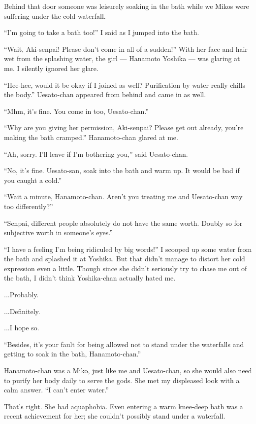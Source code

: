 Behind that door someone was leisurely soaking in the bath while we Mikos were suffering under the cold waterfall.

``I'm going to take a bath too!'' I said as I jumped into the bath.

``Wait, Aki-senpai! Please don't come in all of a sudden!''  With her face and hair wet from the splashing water, the girl --- Hanamoto Yoshika --- was glaring at me. I silently ignored her glare.

``Hee-hee, would it be okay if I joined as well? Purification by water really chills the body.''  Uesato-chan appeared from behind and came in as well.

``Mhm, it's fine. You come in too, Uesato-chan.''

``Why are you giving her permission, Aki-senpai? Please get out already, you're making the bath cramped.'' Hanamoto-chan glared at me.

``Ah, sorry. I'll leave if I'm bothering you,'' said Uesato-chan.

``No, it's fine. Uesato-san, soak into the bath and warm up. It would be bad if you caught a cold.''

``Wait a minute, Hanamoto-chan. Aren't you treating me and Uesato-chan way too differently?''

``Senpai, different people absolutely do not have the same worth. Doubly so for subjective worth in someone's eyes.''

``I have a feeling I'm being ridiculed by big words!''  I scooped up some water from the bath and splashed it at Yoshika. But that didn't manage to distort her cold expression even a little. Though since she didn't seriously try to chase me out of the bath, I didn't think Yoshika-chan actually hated me.

...Probably.

...Definitely.

...I hope so.

``Besides, it's your fault for being allowed not to stand under the waterfalls and getting to soak in the bath, Hanamoto-chan.''

Hanamoto-chan was a Miko, just like me and Uesato-chan, so she would also need to purify her body daily to serve the gods. She met my displeased look with a calm answer.  ``I can't enter water.''

That's right. She had aquaphobia. Even entering a warm knee-deep bath was a recent achievement for her; she couldn't possibly stand under a waterfall.

